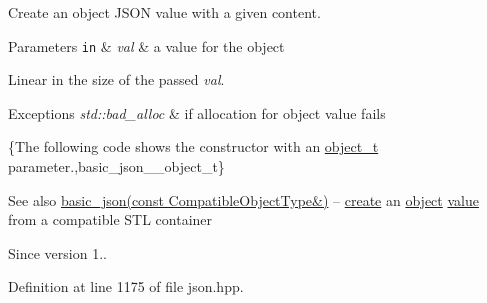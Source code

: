 Create an object J\+S\+O\+N value with a given content.


\begin{DoxyParams}[1]{Parameters}
\mbox{\tt in}  & {\em val} & a value for the object\\
\hline
\end{DoxyParams}
Linear in the size of the passed {\itshape val}.


\begin{DoxyExceptions}{Exceptions}
{\em std\+::bad\+\_\+alloc} & if allocation for object value fails\\
\hline
\end{DoxyExceptions}
\{The following code shows the constructor with an \hyperlink{classnlohmann_1_1basic__json_a0ac9894c9de8dc551cf2e5f1c605537f}{object\+\_\+t} parameter.,basic\+\_\+json\+\_\+\+\_\+object\+\_\+t\}

\begin{DoxySeeAlso}{See also}
\hyperlink{classnlohmann_1_1basic__json_ab7be2bc58ae0c2c2c30d40f15d6399f8}{basic\+\_\+json(const Compatible\+Object\+Type\&)} -- \hyperlink{classnlohmann_1_1basic__json_a27df4303fbc83071275074486b54a40e}{create} an \hyperlink{classnlohmann_1_1basic__json_ad25b2f8c21e241e2d63455537a9294ff}{object} \hyperlink{classnlohmann_1_1basic__json_a0a2cbbd95862a623e7dc5c37e67dead0}{value} from a compatible S\+T\+L container
\end{DoxySeeAlso}
\begin{DoxySince}{Since}
version 1.. 
\end{DoxySince}


Definition at line 1175 of file json.\+hpp.

\hypertarget{classnlohmann_1_1basic__json_ab7be2bc58ae0c2c2c30d40f15d6399f8}{}
